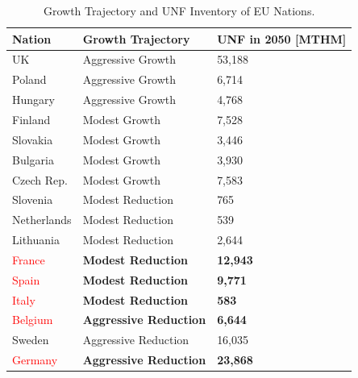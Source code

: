 \begin{frame}
\begin{table}[h]
\begin{adjustbox}{max totalsize={0.7\textwidth}{.8\textheight}, center}
\begin{tabularx}{\textwidth}{lbb}
                    \textbf{Nation} & \textbf{Growth Trajectory} & \small{\textbf{UNF in 2050 [MTHM] }}\\
                    \hline
                    UK & Aggressive Growth & 53,188\\
                    \hline
                    Poland & Aggressive Growth & 6,714\\
                    \hline
                    Hungary & Aggressive Growth & 4,768 \\ 
                    \hline
                    Finland & Modest Growth &  7,528\\
                    \hline
                    Slovakia & Modest Growth & 3,446\\
                    \hline
                    Bulgaria & Modest Growth & 3,930 \\
                    \hline
                    Czech Rep. & Modest Growth & 7,583\\
                    \hline
                    Slovenia & Modest Reduction & 765\\
                    \hline
                    Netherlands & Modest Reduction & 539\\
                    \hline
                    Lithuania & Modest Reduction & 2,644 \\
                    \hline
                    \textcolor{red}{France} & \textbf{Modest Reduction} & \textbf{12,943} \\
                    \hline 
                    \textcolor{red}{Spain} & \textbf{Modest Reduction} &  \textbf{9,771} \\
                    \hline
                    \textcolor{red}{Italy} & \textbf{Modest Reduction} & \textbf{583}\\
                    \hline
                    \textcolor{red}{Belgium} & \textbf{Aggressive Reduction} & \textbf{6,644}\\
                    \hline
                    Sweden & Aggressive Reduction & 16,035\\
                    \hline
                    \textcolor{red}{Germany} & \textbf{Aggressive Reduction} & \textbf{23,868}\\
                    \hline
                    
                \end{tabularx}
    \end{adjustbox}
    \caption {Growth Trajectory and UNF Inventory of \gls{EU} Nations.}
    \label{tab:which_count}
\end{table}
\end{frame}


